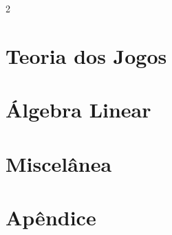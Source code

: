 \documentclass{article}
\begin{document}
\begin{multicols}{2}












\clearpage

\section{Teoria dos Jogos}





\clearpage

\section{Álgebra Linear}







\clearpage

\section{Miscelânea}




\section{Apêndice}







\end{multicols}
\end{document}
